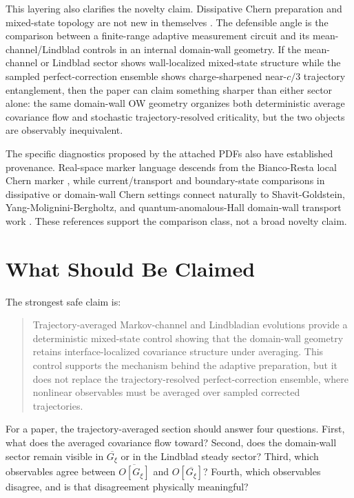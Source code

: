 \documentclass[aps,prb,onecolumn,nofootinbib,superscriptaddress]{revtex4-2}
\newcommand{\avg}[1]{\overline{#1}}
\newcommand{\Gtraj}{G_{\xi}}
\newcommand{\Gbar}{\avg{G_{\xi}}}
\begin{document}
This layering also clarifies the novelty claim.  Dissipative Chern preparation
and mixed-state topology are not new in themselves
\cite{DiehlRicoBaranovZoller2011,BudichZollerDiehl2015,BudichDiehl2015,BardynEtAl2018,WawerFleischhauer2021,Goldstein2019}.
The defensible angle is the comparison between a finite-range adaptive measurement circuit and its
mean-channel/Lindblad controls in an internal domain-wall geometry.  If the
mean-channel or Lindblad sector shows wall-localized mixed-state structure while
the sampled perfect-correction ensemble shows charge-sharpened near-\(c/3\)
trajectory entanglement, then the paper can claim something sharper than either
sector alone: the same domain-wall OW geometry organizes both deterministic
average covariance flow and stochastic trajectory-resolved criticality, but the
two objects are observably inequivalent.

The specific diagnostics proposed by the attached PDFs also have established
provenance.  Real-space marker language descends from the Bianco-Resta local
Chern marker \cite{BiancoResta2011}, while current/transport and boundary-state
comparisons in dissipative or domain-wall Chern settings connect naturally to
Shavit-Goldstein, Yang-Molignini-Bergholtz, and quantum-anomalous-Hall
domain-wall transport work
\cite{ShavitGoldstein2020,YangMoligniniBergholtz2023,UpadhyayaTserkovnyak2016,RosenEtAl2017}.
These references support the comparison class, not a broad novelty claim.

\section{What Should Be Claimed}

The strongest safe claim is:
\begin{quote}
Trajectory-averaged Markov-channel and Lindbladian evolutions provide a
deterministic mixed-state control showing that the domain-wall geometry retains
interface-localized covariance structure under averaging.  This control supports
the mechanism behind the adaptive preparation, but it does not replace the
trajectory-resolved perfect-correction ensemble, where nonlinear observables
must be averaged over sampled corrected trajectories.
\end{quote}

For a paper, the trajectory-averaged section should answer four questions.
First, what does the averaged covariance flow toward?  Second, does the
domain-wall sector remain visible in \(\Gbar\) or in the Lindblad steady sector?
Third, which observables agree between \(\avg{O[\Gtraj]}\) and \(O[\Gbar]\)?
Fourth, which observables disagree, and is that disagreement physically
meaningful?
\end{document}
